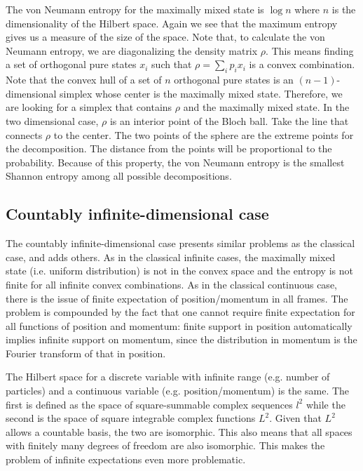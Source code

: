 The von Neumann entropy for the maximally mixed state is $\log n$ where $n$ is the dimensionality of the Hilbert space. Again we see that the maximum entropy gives us a measure of the size of the space. Note that, to calculate the von Neumann entropy, we are diagonalizing the density matrix $\rho$. This means finding a set of orthogonal pure states $x_i$ such that $\rho = \sum_i p_i x_i$ is a convex combination. Note that the convex hull of a set of $n$ orthogonal pure states is an $(n-1)$-dimensional simplex whose center is the maximally mixed state. Therefore, we are looking for a simplex that contains $\rho$ and the maximally mixed state. In the two dimensional case, $\rho$ is an interior point of the Bloch ball. Take the line that connects $\rho$ to the center. The two points of the sphere are the extreme points for the decomposition. The distance from the points will be proportional to the probability. Because of this property, the von Neumann entropy is the smallest Shannon entropy among all possible decompositions.


\subsection{Countably infinite-dimensional case}

The countably infinite-dimensional case presents similar problems as the classical case, and adds others. As in the classical infinite cases, the maximally mixed state (i.e. uniform distribution) is not in the convex space and the entropy is not finite for all infinite convex combinations. As in the classical continuous case, there is the issue of finite expectation of position/momentum in all frames. The problem is compounded by the fact that one cannot require finite expectation for all functions of position and momentum: finite support in position automatically implies infinite support on momentum, since the distribution in momentum is the Fourier transform of that in position.

The Hilbert space for a discrete variable with infinite range (e.g. number of particles) and a continuous variable (e.g. position/momentum) is the same. The first is defined as the space of square-summable complex sequences $l^2$ while the second is the space of square integrable complex functions $L^2$. Given that $L^2$ allows a countable basis, the two are isomorphic. This also means that all spaces with finitely many degrees of freedom are also isomorphic. This makes the problem of infinite expectations even more problematic.

